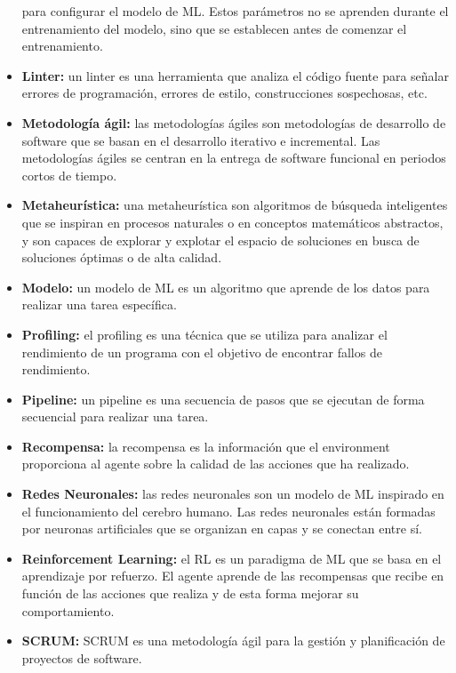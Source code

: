 \begin{itemize}
    para configurar el modelo de ML. Estos parámetros no se aprenden durante el entrenamiento
    del modelo, sino que se establecen antes de comenzar el entrenamiento.
    \item \textbf{Linter:} un linter es una herramienta que analiza el código fuente 
    para señalar errores de programación, errores de estilo, construcciones sospechosas, etc.
    \item \textbf{Metodología ágil:} las metodologías ágiles son metodologías de desarrollo
    de software que se basan en el desarrollo iterativo e incremental. Las metodologías ágiles
    se centran en la entrega de software funcional en periodos cortos de tiempo.
    \item \textbf{Metaheurística:} una metaheurística son algoritmos de búsqueda inteligentes 
    que se inspiran en procesos naturales o en conceptos matemáticos abstractos, y son capaces 
    de explorar y explotar el espacio de soluciones en busca de soluciones óptimas o de alta calidad.
    \item \textbf{Modelo:} un modelo de ML es un algoritmo que aprende de los datos
    para realizar una tarea específica.
    \item \textbf{Profiling:} el profiling es una técnica que se utiliza para analizar
    el rendimiento de un programa con el objetivo de encontrar fallos de rendimiento.
    \item \textbf{Pipeline: } un pipeline es una secuencia de pasos que se ejecutan
    de forma secuencial para realizar una tarea.
    \item \textbf{Recompensa:} la recompensa es la información que el environment
    proporciona al agente sobre la calidad de las acciones que ha realizado.
    \item \textbf{Redes Neuronales:} las redes neuronales son un modelo de ML inspirado
    en el funcionamiento del cerebro humano. Las redes neuronales están formadas por
    neuronas artificiales que se organizan en capas y se conectan entre sí.
    \item \textbf{Reinforcement Learning:} el RL es un paradigma de ML que se basa
    en el aprendizaje por refuerzo. El agente aprende de las recompensas que recibe
    en función de las acciones que realiza y de esta forma mejorar su comportamiento.
    \item \textbf{SCRUM:} SCRUM es una metodología ágil para la gestión y planificación
    de proyectos de software.
\end{itemize}

\pagebreak